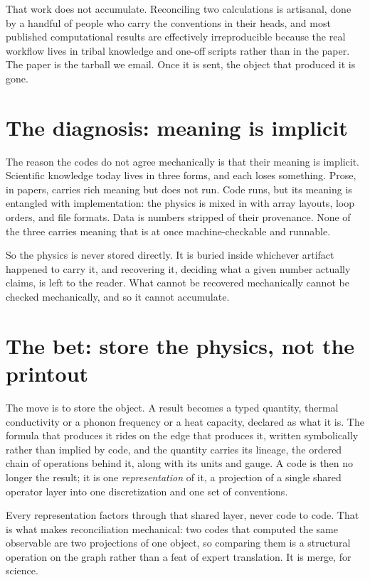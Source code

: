 \documentclass[11pt,a4paper]{article}
\begin{document}
That work does not accumulate. Reconciling two calculations is artisanal, done by
a handful of people who carry the conventions in their heads, and most published
computational results are effectively irreproducible because the real workflow
lives in tribal knowledge and one-off scripts rather than in the paper. The paper
is the tarball we email. Once it is sent, the object that produced it is gone.

\section{The diagnosis: meaning is implicit}

The reason the codes do not agree mechanically is that their meaning is implicit.
Scientific knowledge today lives in three forms, and each loses something. Prose,
in papers, carries rich meaning but does not run. Code runs, but its meaning is
entangled with implementation: the physics is mixed in with array layouts, loop
orders, and file formats. Data is numbers stripped of their provenance. None of
the three carries meaning that is at once machine-checkable and runnable.

So the physics is never stored directly. It is buried inside whichever artifact
happened to carry it, and recovering it, deciding what a given number actually
claims, is left to the reader. What cannot be recovered mechanically cannot be
checked mechanically, and so it cannot accumulate.

\section{The bet: store the physics, not the printout}

The move is to store the object. A result becomes a typed quantity, thermal
conductivity or a phonon frequency or a heat capacity, declared as what it is. The
formula that produces it rides on the edge that produces it, written symbolically
rather than implied by code, and the quantity carries its lineage, the ordered
chain of operations behind it, along with its units and gauge. A code is then no
longer the result; it is one \emph{representation} of it, a projection of a single
shared operator layer into one discretization and one set of conventions.

Every representation factors through that shared layer, never code to code. That
is what makes reconciliation mechanical: two codes that computed the same
observable are two projections of one object, so comparing them is a structural
operation on the graph rather than a feat of expert translation. It is merge, for
science.
\end{document}

